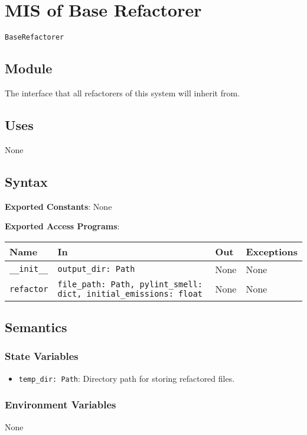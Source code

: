 \documentclass[12pt, titlepage]{article}
\begin{document}
\newpage

\section{MIS of Base Refactorer} \label{mis:baseR}

\texttt{BaseRefactorer}

\subsection{Module}

The interface that all refactorers of this system will inherit from.

\subsection{Uses}

None

\subsection{Syntax}
\noindent
\textbf{Exported Constants}: None

\noindent
\textbf{Exported Access Programs}:

\begin{tabularx}{\linewidth}{|l|>{\raggedright\arraybackslash}X|l|l|}
  \toprule Name & In & Out & Exceptions \\\hline
  \midrule
  \texttt{\_\_init\_\_} & \texttt{output\_dir: Path} & None & None \\\hline
  \texttt{refactor} & \texttt{file\_path: Path, pylint\_smell: dict, initial\_emissions: float} & None & None \\
  \hline
  \bottomrule
\end{tabularx}

\subsection{Semantics}

\subsubsection{State Variables}
\begin{itemize}
  \item \texttt{temp\_dir: Path}: Directory path for storing refactored files.
\end{itemize}

\subsubsection{Environment Variables}
None
\end{document}
